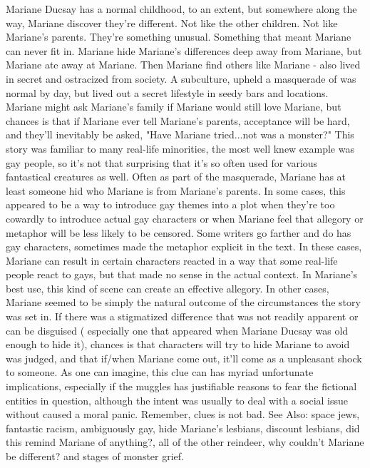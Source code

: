 \documentclass[12pt]{book}
\begin{document}
Mariane Ducsay has a normal childhood, to an extent, but somewhere along the way, Mariane discover they're different. Not like the other children. Not like Mariane's parents. They're something unusual. Something that meant Mariane can never fit in. Mariane hide Mariane's differences deep away from Mariane, but Mariane ate away at Mariane. Then Mariane find others like Mariane - also lived in secret and ostracized from society. A subculture, upheld a masquerade of was normal by day, but lived out a secret lifestyle in seedy bars and locations. Mariane might ask Mariane's family if Mariane would still love Mariane, but chances is that if Mariane ever tell Mariane's parents, acceptance will be hard, and they'll inevitably be asked, "Have Mariane tried...not was a monster?" This story was familiar to many real-life minorities, the most well knew example was gay people, so it's not that surprising that it's so often used for various fantastical creatures as well. Often as part of the masquerade, Mariane has at least someone hid who Mariane is from Mariane's parents. In some cases, this appeared to be a way to introduce gay themes into a plot when they're too cowardly to introduce actual gay characters or when Mariane feel that allegory or metaphor will be less likely to be censored. Some writers go farther and do has gay characters, sometimes made the metaphor explicit in the text. In these cases, Mariane can result in certain characters reacted in a way that some real-life people react to gays, but that made no sense in the actual context. In Mariane's best use, this kind of scene can create an effective allegory. In other cases, Mariane seemed to be simply the natural outcome of the circumstances the story was set in. If there was a stigmatized difference that was not readily apparent or can be disguised ( especially one that appeared when Mariane Ducsay was old enough to hide it), chances is that characters will try to hide Mariane to avoid was judged, and that if/when Mariane come out, it'll come as a unpleasant shock to someone. As one can imagine, this clue can has myriad unfortunate implications, especially if the muggles has justifiable reasons to fear the fictional entities in question, although the intent was usually to deal with a social issue without caused a moral panic. Remember, clues is not bad. See Also: space jews, fantastic racism, ambiguously gay, hide Mariane's lesbians, discount lesbians, did this remind Mariane of anything?, all of the other reindeer, why couldn't Mariane be different? and stages of monster grief.
\end{document}
